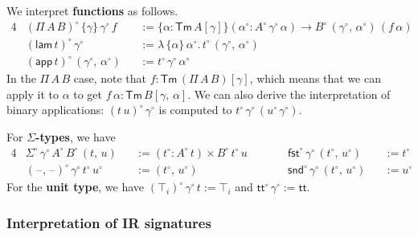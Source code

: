 \documentclass[acmsmall,screen,review]{acmart}
\newcommand{\msf}[1]{{\mathsf{#1}}}
\newcommand{\ttt}{\msf{tt}}
\newcommand{\blank}{{\mathord{\hspace{1pt}\text{--}\hspace{1pt}}}}
\newcommand{\fst}{\msf{fst}}
\newcommand{\snd}{\msf{snd}}
\newcommand{\Tm}{\msf{Tm}}
\newcommand{\w}{\circ}
\newcommand{\lam}{\msf{lam}}
\newcommand{\app}{\msf{app}}
\begin{document}
We interpret \textbf{functions} as follows.
\begin{alignat*}{4}
  &(\Pi\,A\,B)^\w\,\{\gamma\}\,\gamma^\w\,f &&:= \{\alpha : \Tm\,A[\gamma]\}(\alpha^\w : A^\w\,\gamma^\w\,\alpha) \to B^\w\,(\gamma^\w,\,\alpha^\w)\,(f\,\alpha)\\
  &(\lam\,t)^\w\,\gamma^\w &&:= \lambda\,\{\alpha\}\,\alpha^\w.\,t^\w\,(\gamma^\w,\,\alpha^\w)\\
  &(\app\,t)^\w\,(\gamma^\w,\,\alpha^\w) &&:= t^\w\,\gamma^\w\,\alpha^\w
\end{alignat*}
In the $\Pi\,A\,B$ case, note that $f : \Tm\,(\Pi\,A\,B)[\gamma]$, which means that we can apply it
to $\alpha$ to get $f\,\alpha : \Tm\,B[\gamma,\,\alpha]$. We can also derive the interpretation of
binary applications: $(t\,u)^\w\,\gamma^\w$ is computed to $t^\w\,\gamma^\w\,(u^\w\,\gamma^\w)$.

For \textbf{$\Sigma$-types}, we have
\begin{alignat*}{4}
  &\Sigma^\w\,\gamma^\w\,A^\w\,B^\w\,(t,\,u)   &&:= (t^\w : A^\w\,t) \times B^\w\,t^\w\,u\hspace{2em}  && \fst^\w\,\gamma^\w\,(t^\w,\,u^\w) &&:= t^\w \\
  &(\blank,\blank)^\w\,\gamma^\w\,t^\w\,u^\w   &&:= (t^\w,\,u^\w)                                     && \snd^\w\,\gamma^\w\,(t^\w,\,u^\w) &&:= u^\w
\end{alignat*}
For the \textbf{unit type}, we have $(\top_i)^\w\,\gamma^\w\,t := \top_i$ and $\ttt^\w\,\gamma^\w := \ttt$.

\subsubsection{Interpretation of IR signatures}\label{sec:ir-signatures-canonicity}
\end{document}
